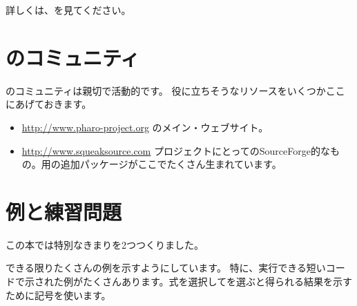 \documentclass[a4paper,10pt,twoside]{book}
\begin{document}
{\begin{itemize}
\end{itemize}

詳しくは、\pbe を見てください。


\section*{ \pharo のコミュニティ}

\pharo のコミュニティは親切で活動的です。
役に立ちそうなリソースをいくつかここにあげておきます。

\begin{itemize}
\item \url{http://www.pharo-project.org} \pharo のメイン・ウェブサイト。


\item \url{http://www.squeaksource.com} \pharo プロジェクトにとってのSourceForge的なもの。\pharo 用の追加パッケージがここでたくさん生まれています。

\end{itemize}

\section*{例と練習問題}

この本では特別なきまりを2つつくりました。

できる限りたくさんの例を示すようにしています。
特に、実行できる短いコードで示された例がたくさんあります。式を選択してを選ぶと得られる結果を示すために\ct{-->}記号を使います。

}
\end{document}
